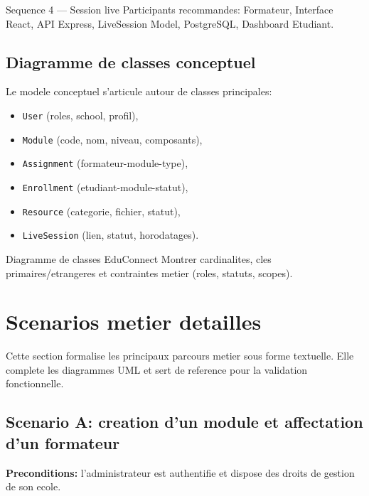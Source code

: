 ﻿\documentclass[12pt,a4paper,oneside]{report}
\begin{document}
\begin{figurebox}{Sequence 4 — Session live}
Participants recommandes: Formateur, Interface React, API Express, LiveSession Model, PostgreSQL, Dashboard Etudiant.
\end{figurebox}

\subsection{Diagramme de classes conceptuel}

Le modele conceptuel s'articule autour de classes principales:
\begin{itemize}
  \item \texttt{User} (roles, school, profil),
  \item \texttt{Module} (code, nom, niveau, composants),
  \item \texttt{Assignment} (formateur-module-type),
  \item \texttt{Enrollment} (etudiant-module-statut),
  \item \texttt{Resource} (categorie, fichier, statut),
  \item \texttt{LiveSession} (lien, statut, horodatages).
\end{itemize}

\begin{figurebox}{Diagramme de classes EduConnect}
Montrer cardinalites, cles primaires/etrangeres et contraintes metier (roles, statuts, scopes).
\end{figurebox}

\section{Scenarios metier detailles}

Cette section formalise les principaux parcours metier sous forme textuelle. Elle complete les diagrammes UML et sert de reference pour la validation fonctionnelle.

\subsection{Scenario A: creation d'un module et affectation d'un formateur}

\textbf{Preconditions:} l'administrateur est authentifie et dispose des droits de gestion de son ecole.
\end{document}
